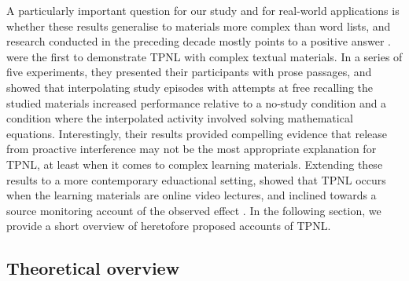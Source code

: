 \documentclass[../main.tex]{subfiles}
\begin{document}
A particularly important question for our study and for real-world applications 
is whether these results generalise to materials more complex than word lists, 
and research conducted in the preceding decade mostly points to a positive 
answer \citep{wissmanInterimTestEffect2011, divisRetrievalSpeedsContext2014, 
szpunarInterpolatedMemoryTests2013, jingInterpolatedTestingInfluences2016}. 
\cite{wissmanInterimTestEffect2011} were the first
to demonstrate TPNL with complex textual materials. In a series of five 
experiments, they presented their participants with prose passages, and showed 
that interpolating study episodes with attempts at free recalling the studied 
materials increased performance relative to a no-study condition and a 
condition where the interpolated activity involved solving mathematical 
equations. Interestingly, their results provided compelling evidence that 
release from proactive interference may not be the most appropriate explanation 
for TPNL, at least when
it comes to complex learning materials. Extending these results to a more 
contemporary eduactional setting, \cite{szpunarInterpolatedMemoryTests2013} 
showed that TPNL occurs when the learning materials are online video lectures, 
and inclined towards a source monitoring account of the observed effect 
\cite{brewerEffectsFreeRecall2010}. In the following section, we provide a 
short overview of heretofore proposed accounts of TPNL.

\hypertarget{theory}{%
\subsection{Theoretical overview}}
\end{document}
